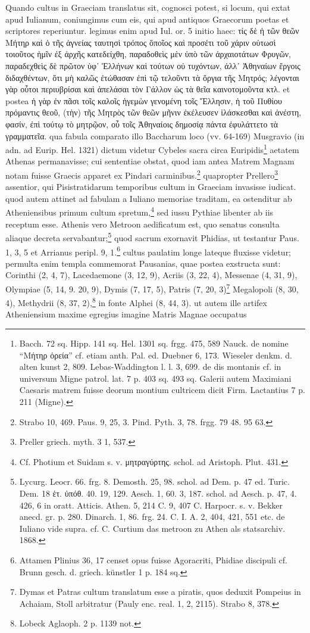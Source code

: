 \documentclass[a4paper, 11pt, oneside, polutonikogreek, german]{article}
\begin{document}
Quando cultus in Graeciam translatus sit, cognosci potest, si locum, qui extat apud Iulianum, coniungimus cum eis, qui apud antiquos Graecorum poetas et scriptores reperiuntur. legimus enim apud Iul. or. 5 initio haec: τίς δὲ ἡ τῶν θεῶν Μήτηρ καὶ ὁ τῆς ἁγνείας ταυτησὶ τρόπος ὅποῖος καὶ προσέτι τοῦ χάριν οὑτωσὶ τοιοῦτος ἡμῖν ἐξ ἀρχῆς κατεδείχθη, παραδοθεὶς μὲν ὑπὸ τῶν ἀρχαιοτάτων Φρυγῶν, παραδεχθεὶς δὲ πρῶτον ὑφ᾿ Ἑλλήνων καὶ τούτων οὐ τυχόντων, ἀλλ᾿ Ἀθηναίων ἔργοις διδαχθέντων, ὅτι μὴ καλῶς ἐτώθασαν ἐπὶ τῷ τελοῦντι τὰ ὄργια τῆς Μητρός; λέγονται γὰρ οὗτοι περιυβρίσαι καὶ ἀπελάσαι τὸν Γάλλον ὡς τὰ θεῖα καινοτομοῦντα κτλ. et postea ἡ γὰρ ἐν πᾶσι τοῖς καλοῖς ἡγεμὼν γενομένη τοῖς Ἕλλησιν, ἡ τοῦ Πυθίου πρόμαντις θεοῦ, (τὴν) τῆς Μητρὸς τῶν θεῶν μῆνιν ἐκέλευσεν ἱλάσκεσθαι καὶ ἀνέστη, φασίν, ἐπὶ τούτῳ τὸ μητρῷον, οὗ τοῖς Ἀθηναίοις δημοσίᾳ πάντα ἐφυλάττετο τὰ γραμματεῖα. qua fabula comparato illo Baccharum loco (vv. 64-169) Musgravio (in adn. ad Eurip. Hel. 1321) dictum videtur Cybeles sacra circa Euripidis\footnote{Bacch. 72 sq. Hipp. 141 sq. Hel. 1301 sq. frgg. 475, 589 Nauck. de nomine "`Μήτηρ ὀρεία"' cf. etiam anth. Pal. ed. Duebner 6, 173. Wieseler denkm. d. alten kunst 2, 809. Lebas-Waddington l. l. 3, 699. de dis montanis cf. in universum Migne patrol. lat. 7 p. 403 sq. 493 sq. Galerii autem Maximiani Caesaris matrem fuisse deorum montium cultricem dicit Firm. Lactantius 7 p. 211 (Migne).} aetatem Athenas permanavisse; cui sententiae obstat, quod iam antea Matrem Magnam notam fuisse Graecis apparet ex Pindari carminibus.\footnote{Strabo 10, 469. Paus. 9, 25, 3. Pind. Pyth. 3, 78. frgg. 79 48. 95 63.} quapropter Prellero\footnote{Preller griech. myth. 3 1, 537.} assentior, qui Pisistratidarum temporibus cultum in Graeciam invasisse iudicat. quod autem attinet ad fabulam a Iuliano memoriae traditam, ea ostenditur ab Atheniensibus primum cultum spretum,\footnote{Cf. Photium et Suidam s. v. μητραγύρτης. schol. ad Aristoph. Plut. 431.} sed iussu Pythiae libenter ab iis receptum esse. Athenis vero Metroon aedificatum est, quo senatus consulta aliaque decreta servabantur;\footnote{Lycurg. Leocr. 66. frg. 8. Demosth. 25, 98. schol. ad Dem. p. 47 ed. Turic. Dem. 18 ἑτ. ὑπόθ. 40. 19, 129. Aesch. 1, 60. 3, 187. schol. ad Aesch. p. 47, 4. 426, 6 in oratt. Atticis. Athen. 5, 214 C. 9, 407 C. Harpocr. s. v. Bekker anecd. gr. p. 280. Dinarch. 1, 86. frg. 24. C. I. A. 2, 404, 421, 551 etc. de Iuliano vide supra. cf. C. Curtium das metroon zu Athen als statsarchiv. 1868.} quod sacrum exornavit Phidias, ut testantur Paus. 1, 3, 5 et Arrianus peripl. 9, 1.\footnote{Attamen Plinius 36, 17 censet opus fuisse Agoracriti, Phidiae discipuli cf. Brunn gesch. d. griech. künstler 1 p. 184 sq.} cultus paulatim longe lateque fluxisse videtur; permulta enim templa commemorat Pausanias, quae postea exstructa sunt: Corinthi (2, 4, 7), Lacedaemone (3, 12, 9), Acriis (3, 22, 4), Messenae (4, 31, 9), Olympiae (5, 14, 9. 20, 9), Dymis (7, 17, 5), Patris (7, 20, 3)\footnote{Dymas et Patras cultum translatum esse a piratis, quos deduxit Pompeius in Achaiam, Stoll arbitratur (Pauly enc. real. 1, 2, 2115). Strabo 8, 378.} Megalopoli (8, 30, 4), Methydrii (8, 37, 2),\footnote{Lobeck Aglaoph. 2 p. 1139 not.} in fonte Alphei (8, 44, 3). ut autem ille artifex Atheniensium maxime egregius imagine Matris Magnae occupatus 
\end{document}
